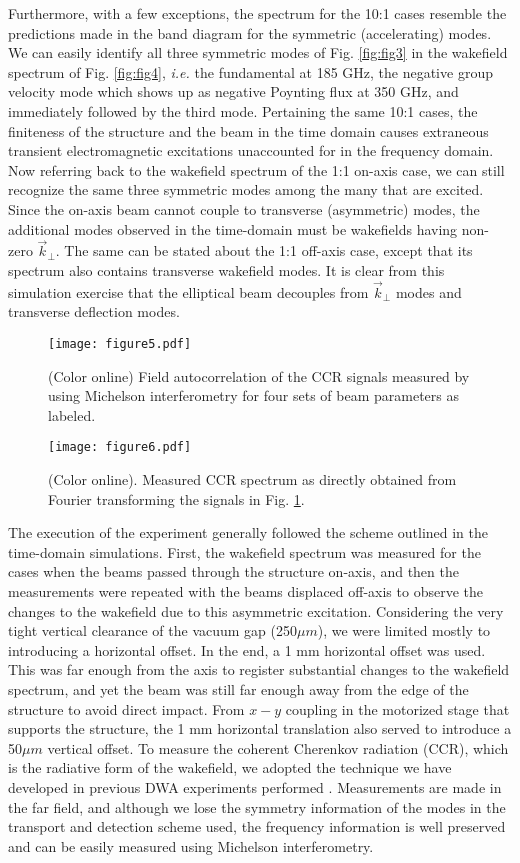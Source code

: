 \documentclass{article}
\begin{document}
Furthermore, with a few exceptions, the spectrum for the 10:1 cases resemble the predictions made in the band diagram for the symmetric (accelerating) modes. We can easily identify all three symmetric modes of Fig. \ref{fig:fig3} in the wakefield spectrum of Fig. \ref{fig:fig4}, \textit{i.e.} the fundamental at 185 GHz, the negative group velocity mode which shows up as negative Poynting flux at 350 GHz, and immediately followed by the third mode. Pertaining the same 10:1 cases, the finiteness of the structure and the beam in the time domain causes extraneous transient electromagnetic excitations unaccounted for in the frequency domain. Now referring back to the wakefield spectrum of the 1:1 on-axis case, we can still recognize the same three symmetric modes among the many that are excited. Since the on-axis beam cannot couple to transverse (asymmetric) modes, the additional modes observed in the time-domain must be wakefields having non-zero $\vec{k}_\perp$. The same can be stated about the 1:1 off-axis case, except that its spectrum also contains transverse wakefield modes. It is clear from this simulation exercise that the elliptical beam decouples from $\vec{k}_\perp$ modes and transverse deflection modes. 
\begin{figure}
\texttt{[image: figure5.pdf]}
\caption{\label{fig:fig5} (Color online) Field autocorrelation of the CCR signals measured by using Michelson interferometry for four sets of beam parameters as labeled.}
\end{figure}
\begin{figure}
\texttt{[image: figure6.pdf]}
\caption{\label{fig:fig6}(Color online). Measured CCR spectrum as directly obtained from Fourier transforming the signals in Fig. \ref{fig:fig5}.}
\end{figure}
The execution of the experiment generally followed the scheme outlined in the time-domain simulations. First, the wakefield spectrum was measured for the cases when the beams passed through the structure on-axis, and then the measurements were repeated with the beams displaced off-axis to observe the changes to the wakefield due to this asymmetric excitation. Considering the very tight vertical clearance of the vacuum gap (250$\mu m$), we were limited mostly to introducing a horizontal offset. In the end, a 1 mm horizontal offset was used. This was far enough from the axis to register substantial changes to the wakefield spectrum, and yet the beam was still far enough away from the edge of the structure to avoid direct impact. From $x-y$ coupling in the motorized stage that supports the structure, the 1 mm horizontal translation also served to introduce a 50$\mu m$ vertical offset. To measure the coherent Cherenkov radiation (CCR), which is the radiative form of the wakefield, we adopted the technique we have developed in previous DWA experiments performed \cite{Cook2009, Andonian2012, Andonian2014}. Measurements are made in the far field, and although we lose the symmetry information of the modes in the transport and detection scheme used, the frequency information is well preserved and can be easily measured using Michelson interferometry.
\end{document}
